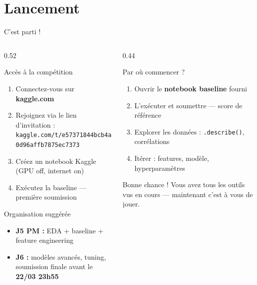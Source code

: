 \documentclass[aspectratio=169, 10pt]{beamer}
\begin{document}
\section*{Lancement}

\begin{frame}{C'est parti !}
  \begin{columns}[T]
    \begin{column}{0.52\textwidth}
      \begin{block}{Accès à la compétition}
        \begin{enumerate}
          \item Connectez-vous sur \textbf{kaggle.com}
          \item Rejoignez via le lien d'invitation :\\
                {\footnotesize\texttt{kaggle.com/t/e57371844bcb4a0d96affb7875ec7373}}
          \item Créez un notebook Kaggle (GPU off, internet on)
          \item Exécutez la baseline --- première soumission
        \end{enumerate}
      \end{block}
      \smallskip
      \begin{block}{Organisation suggérée}
        \begin{itemize}
          \item \textbf{J5 PM :} EDA + baseline + feature engineering
          \item \textbf{J6 :} modèles avancés, tuning,
                soumission finale avant le \textbf{22/03 23h55}
        \end{itemize}
      \end{block}
    \end{column}
    \begin{column}{0.44\textwidth}
      \begin{exampleblock}{Par où commencer ?}
        \begin{enumerate}
          \item Ouvrir le \textbf{notebook baseline} fourni
          \item L'exécuter et soumettre --- score de référence
          \item Explorer les données : \texttt{.describe()}, corrélations
          \item Itérer : features, modèle, hyperparamètres
        \end{enumerate}
      \end{exampleblock}
      \smallskip
      \begin{alertblock}{Bonne chance !}
        Vous avez tous les outils vus en cours ---
        maintenant c'est à vous de jouer.
      \end{alertblock}
    \end{column}
  \end{columns}
\end{frame}
\end{document}
